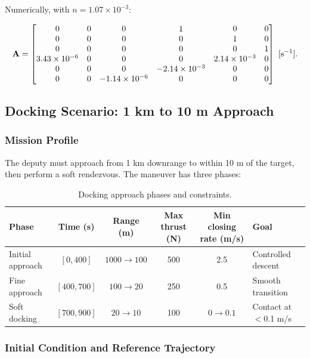 Numerically, with $n = 1.07 \times 10^{-3}$:

\begin{equation}
\mathbf{A} = \begin{bmatrix}
0 & 0 & 0 & 1 & 0 & 0 \\
0 & 0 & 0 & 0 & 1 & 0 \\
0 & 0 & 0 & 0 & 0 & 1 \\
3.43 \times 10^{-6} & 0 & 0 & 0 & 2.14 \times 10^{-3} & 0 \\
0 & 0 & 0 & -2.14 \times 10^{-3} & 0 & 0 \\
0 & 0 & -1.14 \times 10^{-6} & 0 & 0 & 0
\end{bmatrix}~[\text{s}^{-1}].
\label{eq:ch8:A-numeric}
\end{equation}

\subsection{Docking Scenario: 1 km to 10 m Approach}

\subsubsection{Mission Profile}

The deputy must approach from 1 km downrange to within 10 m of the target, then perform
a soft rendezvous. The maneuver has three phases:

\begin{table}[h]
\centering
\caption{Docking approach phases and constraints.}
\label{tab:docking-phases}
\begin{tabular}{@{}lccccl@{}}
\toprule
\textbf{Phase} & Time (s) & Range (m) & Max thrust (N) & Min closing rate (m/s) & Goal \\
\midrule
Initial approach & $[0, 400]$ & $1000 \to 100$ & 500 & 2.5 & Controlled descent \\
Fine approach & $[400, 700]$ & $100 \to 20$ & 250 & 0.5 & Smooth transition \\
Soft docking & $[700, 900]$ & $20 \to 10$ & 100 & $0 \to 0.1$ & Contact at $<$0.1 m/s \\
\bottomrule
\end{tabular}
\end{table}

\subsubsection{Initial Condition and Reference Trajectory}

